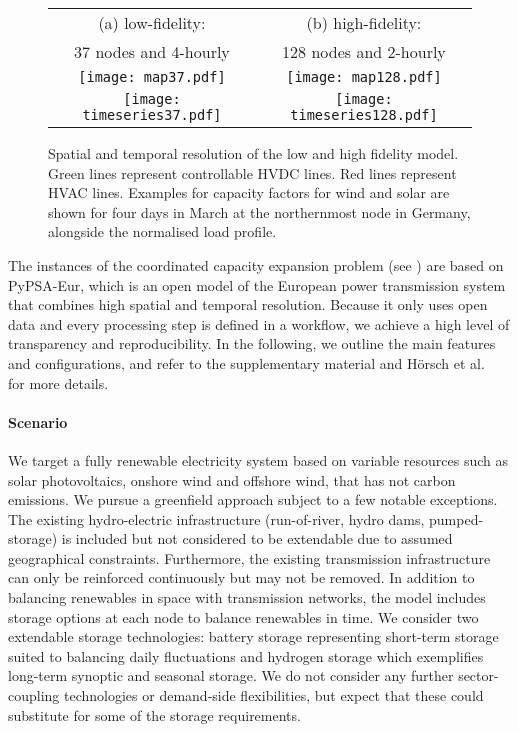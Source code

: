 
\begin{figure}
    \centering
        \begin{tabular}{cc}
            \footnotesize (a) low-fidelity: & \footnotesize (b) high-fidelity: \\
            \footnotesize 37 nodes and 4-hourly & \footnotesize 128 nodes and 2-hourly \\
            \texttt{[image: map37.pdf]} &
            \texttt{[image: map128.pdf]} \\
            \texttt{[image: timeseries37.pdf]} &
            \texttt{[image: timeseries128.pdf]} \\
        \end{tabular}
    \caption[Spatial and temporal resolution of the low and high fidelity model]{Spatial and temporal resolution of the low and high fidelity model.
    Green lines represent controllable HVDC lines. Red lines represent HVAC lines.
    Examples for capacity factors for wind and solar are shown for four days in March
    at the northernmost node in Germany, alongside the normalised load profile.}
    \label{fig:pypsaeur}
\end{figure}


The instances of the coordinated capacity expansion problem
 (see ) are based on \mbox{PyPSA-Eur}, which is an open model of
 the European power transmission system that combines high spatial and temporal
 resolution.\cite{pypsaeur} Because it only uses open data and every processing
 step is defined in a workflow,\cite{snakemake} we achieve a high level of
 transparency and reproducibility. In the following, we outline the main
 features and configurations, and refer to the supplementary material and Hörsch
 et al.~\cite{pypsaeur} for more details.

\paragraph{Scenario}
We target a fully renewable electricity system based on variable resources such
as solar photovoltaics, onshore wind and offshore wind, that has not carbon
emissions. We pursue a greenfield approach subject to a few notable exceptions.
The existing hydro-electric infrastructure (run-of-river, hydro dams,
pumped-storage) is included but not considered to be extendable due to assumed
geographical constraints. Furthermore, the existing transmission infrastructure
can only be reinforced continuously but may not be removed. In addition to
balancing renewables in space with transmission networks, the model includes
storage options at each node to balance renewables in time. We consider two
extendable storage technologies: battery storage representing short-term storage
suited to balancing daily fluctuations and hydrogen storage which exemplifies
long-term synoptic and seasonal storage. We do not consider any further
sector-coupling technologies or demand-side flexibilities, but expect that these
could substitute for some of the storage requirements.

